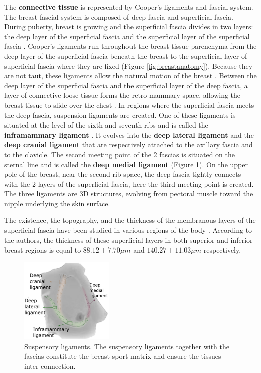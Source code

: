 The \textbf{connective tissue} is represented by Cooper's ligaments and fascial system. The breast fascial system is composed of deep fascia and superficial fascia. During puberty, breast is growing and the superficial fascia divides in two layers: the deep layer of the superficial fascia and the superficial layer of the superficial fascia \citep{kopans2007breast}.  Cooper's ligaments run throughout the breast tissue parenchyma from the deep layer of the superficial fascia beneath the breast to the superficial layer of superficial fascia where they are fixed (Figure \ref{fig:breastanatomy}). Because they are not taut, these ligaments allow the natural motion of the breast \citep{clemente2011anatomy}. Between the deep layer of the superficial fascia and the superficial layer of the deep fascia, a layer of connective loose tissue forms the retro-mammary space, allowing the breast tissue to slide over the chest \citep{mugea2014aesthetic}. In regions where the superficial fascia meets the deep fascia, suspension ligaments are created. One of these ligaments is situated at the level of the sixth and seventh ribs and is called the \textbf{inframammary ligament} \citep{bayati_inframammary_1995}. It evolves into the \textbf{deep lateral ligament} and the \textbf{deep cranial ligament} that are respectively attached to the axillary fascia and to the clavicle. The second meeting point of the 2 fascias is situated on the sternal line and is called the \textbf{deep medial ligament} (Figure \ref{fig:suspensoryligaments}). On the upper pole of the breast, near the second rib space, the deep fascia tightly connects with the 2 layers of the superficial fascia, here the third meeting point is created. The three ligaments are 3D structures, evolving from pectoral muscle toward the nipple underlying the skin surface.


The existence, the topography, and the thickness of the membranous layers of the superficial fascia have been studied in various regions of the body \citep{abu_membranous_2006}. According to the authors, the thickness of these superficial layers in both superior and inferior breast regions is equal to $88.12 \pm 7.70 \mu m$ and $140.27 \pm 11.03 \mu m$ respectively.

\begin{figure}[!h]
\centering
\centerline{\includegraphics[width=0.4\textwidth,keepaspectratio]{figures/breastLigaments.png} }
\caption{Suspensory ligaments. The suspensory ligaments together with the fascias constitute the breast sport matrix and ensure the tissues inter-connection.   \citep{mugea2014aesthetic}}
\label{fig:suspensoryligaments}
\end{figure}


